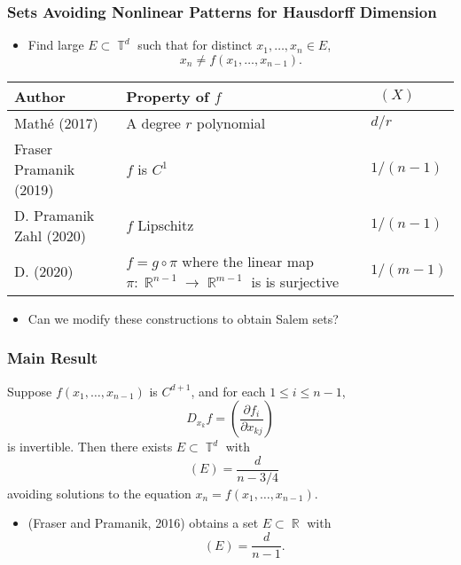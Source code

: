 \documentclass[handout,usenames,dvipsnames]{beamer}
\DeclareMathOperator{\RR}{\mathbb{R}}
\DeclareMathOperator{\TT}{\mathbb{T}}
\DeclareMathOperator{\fordim}{\text{dim}_{\mathbb{F}}}
\DeclareMathOperator{\hausdim}{\text{dim}_{\mathbb{H}}}
\begin{document}
\begin{frame}
    \frametitle{Sets Avoiding Nonlinear Patterns for Hausdorff Dimension}

    \begin{itemize}
        \pause
        \item Find large $E \subset \TT^d$ such that for distinct $x_1,\dots,x_n \in E$,
        \[ x_n \neq f(x_1,\dots,x_{n-1}). \]
    \end{itemize}

    \pause
    \begin{center}
    \begin{tabular}{| p{4cm} | p{4cm} | p{1.6cm} |}
        \hline
        \textbf{Author} & \textbf{Property of $f$} & $\hausdim(X)$\\
        \hline
        Math\'{e} (2017) & A degree $r$ polynomial & $d/r$\\
        \hline
        Fraser Pramanik (2019) & $f$ is $C^1$ & $1/(n-1)$\\
        \hline
        D. Pramanik Zahl (2020) & $f$ Lipschitz & $1/(n-1)$\\
        \hline
        D. (2020) & $f = g \circ \pi$ where the linear map $\pi: \RR^{n-1} \to \RR^{m-1}$ is is surjective & $1/(m-1)$\\
        \hline
    \end{tabular}
    \end{center}

    \begin{itemize}
        \item Can we modify these constructions to obtain Salem sets?
    \end{itemize}
\end{frame}







\begin{frame}
    \frametitle{Main Result}

    \begin{theorem}
        Suppose $f(x_1,\dots,x_{n-1})$ is $C^{d+1}$, and for each $1 \leq i \leq n-1$,
        \[ D_{x_k} f = \left( \frac{\partial f_i}{\partial x_{kj}} \right) \]
        is invertible. Then there exists $E \subset \TT^d$ with
        \[ \fordim(E) = \frac{d}{n - 3/4} \]
        avoiding solutions to the equation $x_n = f(x_1,\dots,x_{n-1})$.
    \end{theorem}

    \begin{itemize}
        \item (Fraser and Pramanik, 2016) obtains a set $E \subset \RR$ with
        \[ \hausdim(E) = \frac{d}{n - 1}. \]
    \end{itemize}
\end{frame}
\end{document}
